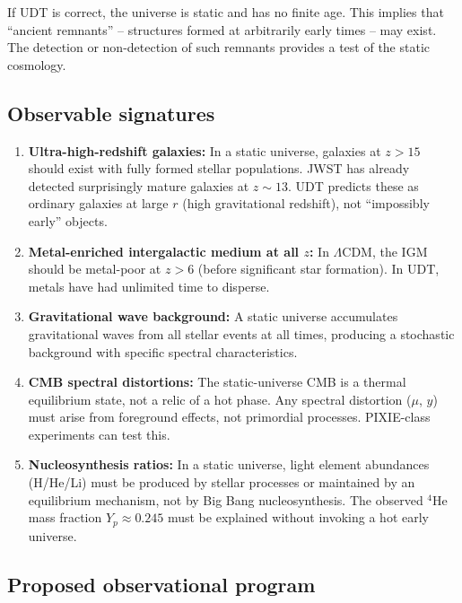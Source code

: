 \documentclass[11pt,letterpaper]{article}
\numberwithin{equation}{section}
\begin{document}
If UDT is correct, the universe is static and has no finite age. This
implies that ``ancient remnants'' -- structures formed at arbitrarily early
times -- may exist. The detection or non-detection of such remnants provides
a test of the static cosmology.

\subsection{Observable signatures}

\begin{enumerate}
  \item \textbf{Ultra-high-redshift galaxies:} In a static universe,
    galaxies at $z > 15$ should exist with fully formed stellar populations.
    JWST has already detected surprisingly mature galaxies at $z \sim 13$.
    UDT predicts these as ordinary galaxies at large $r$ (high gravitational
    redshift), not ``impossibly early'' objects.

  \item \textbf{Metal-enriched intergalactic medium at all $z$:} In $\Lambda$CDM,
    the IGM should be metal-poor at $z > 6$ (before significant star formation).
    In UDT, metals have had unlimited time to disperse.

  \item \textbf{Gravitational wave background:} A static universe accumulates
    gravitational waves from all stellar events at all times, producing a
    stochastic background with specific spectral characteristics.

  \item \textbf{CMB spectral distortions:} The static-universe CMB is a
    thermal equilibrium state, not a relic of a hot phase. Any spectral
    distortion ($\mu$, $y$) must arise from foreground effects, not primordial
    processes. PIXIE-class experiments can test this.

  \item \textbf{Nucleosynthesis ratios:} In a static universe, light element
    abundances (H/He/Li) must be produced by stellar processes or maintained
    by an equilibrium mechanism, not by Big Bang nucleosynthesis. The
    observed $^4$He mass fraction $Y_p \approx 0.245$ must be explained
    without invoking a hot early universe.
\end{enumerate}

\subsection{Proposed observational program}
\end{document}
